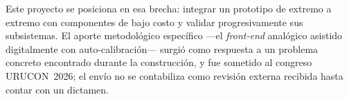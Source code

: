 Este proyecto se posiciona en esa brecha: integrar un prototipo de extremo a extremo con
componentes de bajo costo y validar progresivamente sus subsistemas. El aporte
metodol\'ogico espec\'ifico ---el \emph{front-end} anal\'ogico asistido digitalmente con
auto-calibraci\'on--- surgi\'o como respuesta a un problema concreto encontrado durante la
construcci\'on, y fue sometido al congreso URUCON~2026; el env\'io no se contabiliza como
revisi\'on externa recibida hasta contar con un dictamen.

